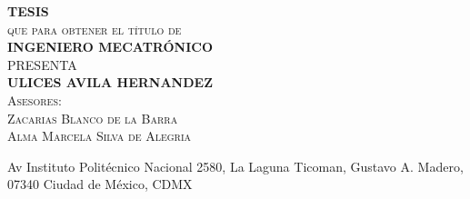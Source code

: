 \begin{center}
\textbf{\textsc{\LARGE T\qquad E\qquad S\qquad I\qquad S}}\\
\vspace{10mm}
\textsc{\LARGE que para obtener el t\'itulo de}\\
\vspace{10mm}
\textbf{\textsc{\LARGE INGENIERO MECATR\'ONICO}}\\
\vspace{10mm}
\textsc{\LARGE PRESENTA}\\
\vspace{10mm}
\textbf{\textsc{\LARGE ULICES AVILA HERNANDEZ}}\\
\vspace{15mm}
\textsc{\Large Asesores:}\\
\vspace{5mm}
\textsc{\Large Zacarias Blanco de la Barra}\\
\textsc{\Large Alma Marcela Silva de Alegria}

\begin{center}
Av Instituto Politécnico Nacional 2580, La Laguna Ticoman, Gustavo A. Madero, 07340 Ciudad de México, CDMX
\end{center}
\end{center}